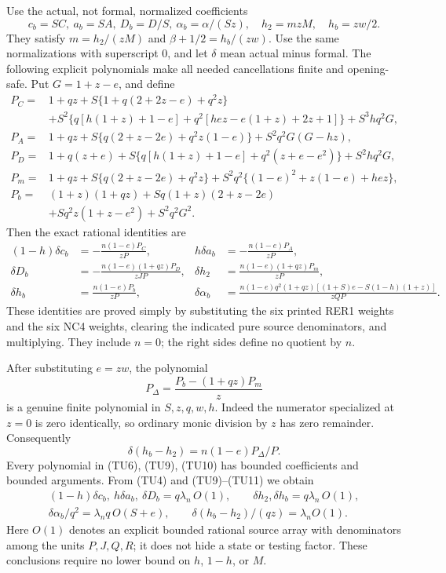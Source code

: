 Use the actual, not formal, normalized coefficients
\[
 c_b=SC,\ a_b=SA,\ D_b=D/S,\ \alpha_b=\alpha/(Sz),\quad
 h_2=mzM,\quad h_b=zw/2.
                                                               \tag{TU8}
\]
They satisfy $m=h_2/(zM)$ and $\beta+1/2=h_b/(zw)$.
Use the same normalizations with superscript $0$, and let $\delta$
mean actual minus formal.  The following explicit polynomials make
all needed cancellations finite and opening-safe.  Put $G=1+z-e$,
and define
\begin{align*}
 P_C={}&1+qz+S\{1+q(2+2z-e)+q^2z\}\\
 &+S^2\{q[h(1+z)+1-e]
          +q^2[hez-e(1+z)+2z+1]\}+S^3hq^2G,\\
 P_A={}&1+qz+S\{q(2+z-2e)+q^2z(1-e)\}
                 +S^2q^2G(G-hz),\\
 P_D={}&1+q(z+e)+S\{q[h(1+z)+1-e]+q^2(z+e-e^2)\}
                 +S^2hq^2G,\\
 P_m={}&1+qz+S\{q(2+z-2e)+q^2z\}
                 +S^2q^2\{(1-e)^2+z(1-e)+hez\},\\
 P_b={}&(1+z)(1+qz)+Sq(1+z)(2+z-2e)\\
       &+Sq^2z(1+z-e^2)+S^2q^2G^2.
\end{align*}
Then the exact rational identities are
\[
\begin{aligned}
 (1-h)\delta c_b&=-\frac{n(1-e)P_C}{zP},&
 h\delta a_b&=-\frac{n(1-e)P_A}{zP},\\
 \delta D_b&=-\frac{n(1-e)(1+qz)P_D}{zJP},&
 \delta h_2&=\frac{n(1-e)(1+qz)P_m}{zP},\\
 \delta h_b&=\frac{n(1-e)P_b}{zP},&
 \delta\alpha_b&=
 \frac{n(1-e)q^2(1+qz)[(1+S)e-S(1-h)(1+z)]}{zQP}.
\end{aligned}                                                   \tag{TU9}
\]
These identities are proved simply by substituting the six printed
RER1 weights and the six NC4 weights, clearing the indicated pure
source denominators, and multiplying.  They include $n=0$; the
right sides define no quotient by $n$.

After substituting $e=zw$, the polynomial
\[
       P_\Delta=\frac{P_b-(1+qz)P_m}{z}                 \tag{TU10}
\]
is a genuine finite polynomial in $S,z,q,w,h$.  Indeed the numerator
specialized at $z=0$ is zero identically, so ordinary monic division
by $z$ has zero remainder.  Consequently
\[
 \delta(h_b-h_2)=n(1-e)P_\Delta/P.
                                                               \tag{TU11}
\]
Every polynomial in (TU6), (TU9), (TU10) has bounded coefficients
and bounded arguments.  From (TU4) and (TU9)--(TU11) we obtain
\[
\begin{gathered}
 (1-h)\delta c_b,\ h\delta a_b,\ \delta D_b
                     =q\lambda_n\,O(1),\qquad
 \delta h_2,\delta h_b=q\lambda_n\,O(1),\\
 \delta\alpha_b/q^2=\lambda_n q\,O(S+e),\qquad
 \delta(h_b-h_2)/(qz)=\lambda_n O(1).
\end{gathered}                                                   \tag{TU12}
\]
Here $O(1)$ denotes an explicit bounded rational source array with
denominators among the units $P,J,Q,R$; it does not hide a state
or testing factor.  These conclusions require no lower bound on
$h$, $1-h$, or $M$.

